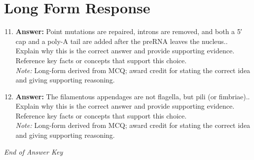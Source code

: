 \documentclass[12pt]{article}
\begin{document}
\section*{Long Form Response}
\begin{enumerate}[label=\arabic*.]
\setcounter{enumi}{10}
\item \textbf{Answer:} Point mutations are repaired, introns are removed, and both a 5′ cap and a poly-A tail are added after the preRNA leaves the nucleus.. Explain why this is the correct answer and provide supporting evidence. Reference key facts or concepts that support this choice.
\\ \textit{Note:} Long-form derived from MCQ; award credit for stating the correct idea and giving supporting reasoning.
\item \textbf{Answer:} The filamentous appendages are not flagella, but pili (or fimbriae).. Explain why this is the correct answer and provide supporting evidence. Reference key facts or concepts that support this choice.
\\ \textit{Note:} Long-form derived from MCQ; award credit for stating the correct idea and giving supporting reasoning.
\end{enumerate}

\vfill
\noindent\textit{End of Answer Key}
\end{document}
